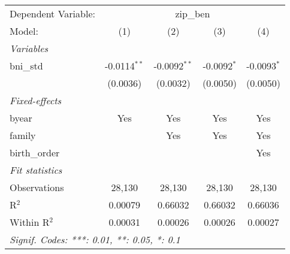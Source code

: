 \begin{tabular}{lcccc}
\tabularnewline\midrule\midrule
Dependent Variable: & \multicolumn{4}{c}{zip\_ben}\\
Model: & (1) & (2) & (3) & (4)\\
\midrule \emph{Variables} &   &   &   &  \\
bni\_std & -0.0114$^{**}$ & -0.0092$^{**}$ & -0.0092$^{*}$ & -0.0093$^{*}$\\
  & (0.0036) & (0.0032) & (0.0050) & (0.0050)\\
\midrule \emph{Fixed-effects} &   &   &   &  \\
byear & Yes & Yes & Yes & Yes\\
family &  & Yes & Yes & Yes\\
birth\_order &  &  &  & Yes\\
\midrule \emph{Fit statistics} &   &   &   &  \\
Observations & 28,130 & 28,130 & 28,130 & 28,130\\
R$^2$ & 0.00079 & 0.66032 & 0.66032 & 0.66036\\
Within R$^2$ & 0.00031 & 0.00026 & 0.00026 & 0.00027\\
\midrule\midrule\multicolumn{5}{l}{\emph{Signif. Codes: ***: 0.01, **: 0.05, *: 0.1}}\\
\end{tabular}


